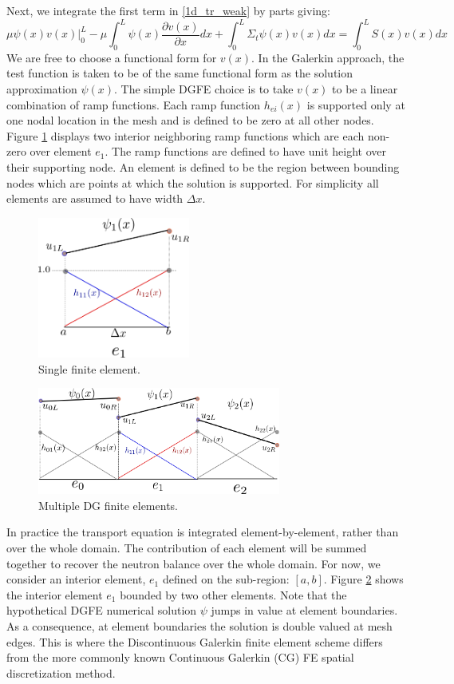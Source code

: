 Next, we integrate the first term in \ref{1d_tr_weak} by parts giving:
\begin{equation}
\mu \psi(x)v(x)|_0^L- \mu \int_0^L  \psi(x) \frac{\partial v(x)}{\partial x} dx + \int_0^L \Sigma_t \psi(x)v(x) dx =  \int_0^L S(x)v(x) dx
\label{1d_tr_weak2}
\end{equation}
We are free to choose a functional form for $v(x)$. In the Galerkin approach, the test function is
taken to be of the same functional form as the solution approximation $\psi(x)$. The simple DGFE choice is to take $v(x)$ to be a
linear combination of ramp functions. Each ramp function $h_{ei}(x)$ is supported only at one nodal location in the mesh
and is defined to be zero at all other nodes. Figure \ref{single_ele} displays two interior neighboring ramp functions which are each non-zero over element $e_1$. The ramp functions are defined to have unit height over their supporting node.  An element is defined to be the region between bounding nodes which are points at which the solution is supported.  For simplicity all elements are assumed to have width $\Delta x$.

\begin{figure}[!htbp]
\centering
\includegraphics[width=5cm]{images/single_ele.png}
\caption{Single finite element.}
\label{single_ele}
\end{figure}

\begin{figure}[!htbp]
\centering
\includegraphics[width=8cm]{images/multi_ele.png}
\caption{Multiple DG finite elements.}
\label{multi_ele}
\end{figure}

In practice the transport equation is integrated element-by-element, rather than over the whole domain.  The contribution of each element will be summed together to recover the neutron balance over the whole domain.  For now, we consider an interior element, $e_1$ defined on the sub-region: $[a, b]$.  Figure \ref{multi_ele} shows the interior element $e_1$ bounded by two other elements.  Note that the hypothetical DGFE numerical solution $\psi$ jumps in value at element boundaries.  As a consequence, at element boundaries the solution is double valued at mesh edges.  This is where the Discontinuous Galerkin finite element scheme differs from the more commonly known Continuous Galerkin (CG) FE spatial discretization method.

